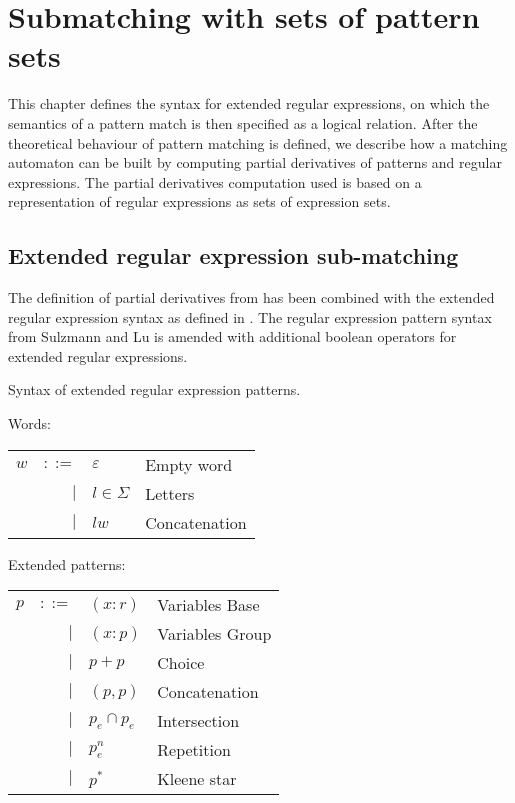 \chapter{Submatching with sets of pattern sets}
\label{submatching}

This chapter defines the syntax for extended regular expressions, on which the
semantics of a pattern match is then specified as a logical relation.  After the
theoretical behaviour of pattern matching is defined, we describe how a matching
automaton can be built by computing partial derivatives of patterns and regular
expressions. The partial derivatives computation used is based on a
representation of regular expressions as sets of expression sets.


\section{Extended regular expression sub-matching}
\label{ere-submatch}

The definition of partial derivatives from \cite{pdpat} has been combined with
the extended regular expression syntax as defined in \cite{pdere}. The regular
expression pattern syntax from Sulzmann and Lu is amended with additional
boolean operators for extended regular expressions.

\begin{defn}
   \label{defn-syn}
   Syntax of extended regular expression patterns.

   Words:

   \begin{tabular}{lrll}
      $w$	& $::=$	& $\varepsilon$		& Empty word	\\
		& $|$	& $l \in \Sigma$	& Letters	\\
		& $|$	& $lw$			& Concatenation	\\
   \end{tabular}

   Extended patterns:

   \begin{tabular}{lrll}
      $p$	& $::=$	& $(x:r)$			& Variables Base	\\
		& $|$	& $(x:p)$			& Variables Group	\\
		& $|$	& $p+p$				& Choice		\\
		& $|$	& $(p,p)$			& Concatenation		\\
		& $|$	& $p_e \cap p_e$		& Intersection		\\
        	& $|$	& $p_e^n$			& Repetition		\\
		& $|$	& $p^*$				& Kleene star		\\
   \end{tabular}
\end{defn}


